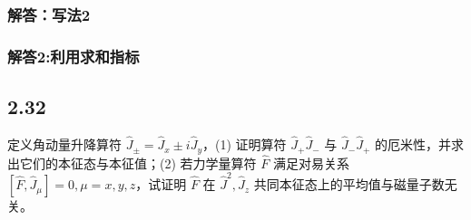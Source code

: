 \subsubsection{解答：写法2}



\subsubsection{解答2:利用求和指标}






\subsection{2.32}
定义角动量升降算符 $\hat{J}_{\pm} = \hat{J}_x \pm i \hat{J}_y$，(1) 证明算符 $\hat{J}_+ \hat{J}_- $ 与 $\hat{J}_- \hat{J}_+ $ 的厄米性，并求出它们的本征态与本征值；(2) 若力学量算符 $\hat{F}$ 满足对易关系 $[\hat{F}, \hat{J}_{\mu}] = 0, \mu = x, y, z$，试证明 $\hat{F}$ 在 $\hat{J}^2, \hat{J}_z$ 共同本征态上的平均值与磁量子数无关。


